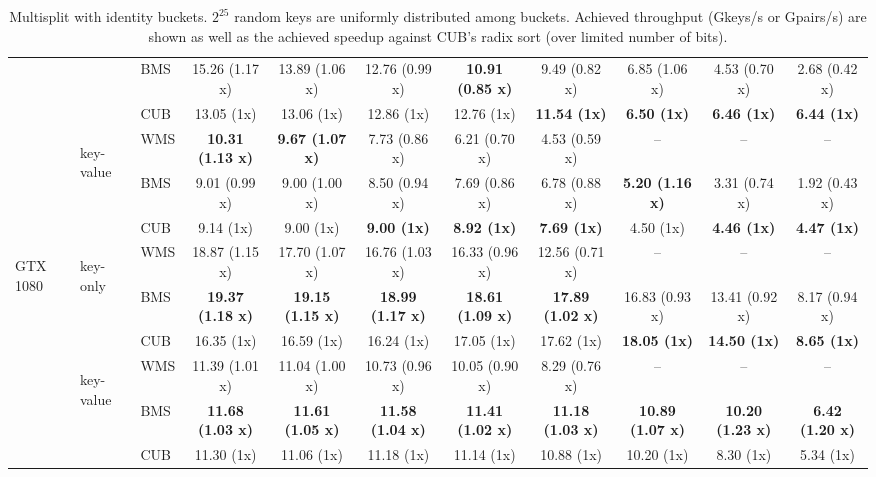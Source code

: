 \begin{table}
{\begin{tabular}{lll cccccccc}
    & & BMS
        &  15.26 (1.17 x) &  13.89 (1.06 x) &  12.76 (0.99 x) &  \textbf{10.91 (0.85 x)} &  9.49 (0.82 x) &  6.85 (1.06 x) &  4.53 (0.70 x) &  2.68 (0.42 x) \\ 
    & & CUB
        & 13.05 (1x) &  13.06 (1x) &  12.86 (1x) &  12.76 (1x) &  \textbf{11.54 (1x)} &  \textbf{6.50 (1x)} &  \textbf{6.46 (1x)} &  \textbf{6.44 (1x)} \\ 
\cmidrule{2-11}
    & \multirow{3}{*}{\begin{turn}{0}\tiny key-value\end{turn}} 
    & WMS 
        & \textbf{10.31 (1.13 x)} &  \textbf{9.67 (1.07 x)} &  7.73 (0.86 x) &  6.21 (0.70 x) &  4.53 (0.59 x) & -- & -- & -- \\ 
    & & BMS
        &  9.01 (0.99 x) &  9.00 (1.00 x) &  8.50 (0.94 x) &  7.69 (0.86 x) &  6.78 (0.88 x) &  \textbf{5.20 (1.16 x)} &  3.31 (0.74 x) &  1.92 (0.43 x) \\ 
    & & CUB
        & 9.14 (1x) &  9.00 (1x) &  \textbf{9.00 (1x)} &  \textbf{8.92 (1x)} &  \textbf{7.69 (1x)} &  4.50 (1x) &  \textbf{4.46 (1x)} &  \textbf{4.47 (1x)} \\
\midrule
\midrule
    \multirow{6}{*}{\begin{turn}{90}GTX 1080  \end{turn}}
    & \multirow{3}{*}{\begin{turn}{0}\tiny key-only\end{turn}} 
    & WMS 
        & 18.87 (1.15 x) &  17.70 (1.07 x) &  16.76 (1.03 x) &  16.33 (0.96 x) &  12.56 (0.71 x)  & -- & -- & -- \\ 
    & & BMS
        & \textbf{19.37 (1.18 x)} &  \textbf{19.15 (1.15 x)} &  \textbf{18.99 (1.17 x)} &  \textbf{18.61 (1.09 x)} &  \textbf{17.89 (1.02 x)} &  16.83 (0.93 x) &  13.41 (0.92 x) &  8.17 (0.94 x)  \\ 
    & & CUB
        &  16.35 (1x) &  16.59 (1x) &  16.24 (1x) &  17.05 (1x) &  17.62 (1x) &  \textbf{18.05 (1x)} &  \textbf{14.50 (1x)} &  \textbf{8.65 (1x)} \\ 
\cmidrule{2-11}
    & \multirow{3}{*}{\begin{turn}{0}\tiny key-value\end{turn}} 
    & WMS 
        & 11.39 (1.01 x) &  11.04 (1.00 x) &  10.73 (0.96 x) &  10.05 (0.90 x) &  8.29 (0.76 x) & -- & -- & -- \\ 
    & & BMS
        &  \textbf{11.68 (1.03 x)} &  \textbf{11.61 (1.05 x)} &  \textbf{11.58 (1.04 x)} &  \textbf{11.41 (1.02 x)} &  \textbf{11.18 (1.03 x)} &  \textbf{10.89 (1.07 x)} &  \textbf{10.20 (1.23 x)} &  \textbf{6.42 (1.20 x)} \\ 
    & & CUB
        & 11.30 (1x) &  11.06 (1x) &  11.18 (1x) &  11.14 (1x) &  10.88 (1x) &  10.20 (1x) &  8.30 (1x) &  5.34 (1x) \\ 
\bottomrule
\end{tabular}
}
  \caption{Multisplit with identity buckets. $2^{25}$ random keys are uniformly distributed among buckets. Achieved throughput (Gkeys/s or Gpairs/s) are shown as well as the achieved speedup against CUB's radix sort (over limited number of bits).}\label{table:sort_bits_rate}
\end{table}
